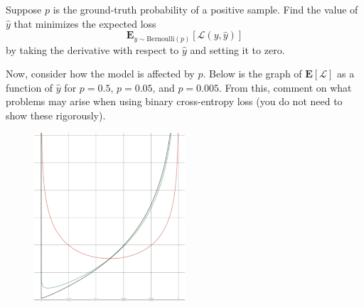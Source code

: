 \documentclass[11pt]{article}
\begin{document}
    \begin{subparts}
        \subpart Suppose $p$ is the ground-truth probability of a positive sample. Find the value of $\hat{y}$ that minimizes the expected loss
        $$\mathbf{E}_{y \sim \text{Bernoulli}(p)}\left[\mathcal{L}(y, \hat{y})\right]$$ by taking the derivative with respect to $\hat{y}$ and setting it to zero.


        \newpage
        \subpart Now, consider how the model is affected by $p$. Below is the graph of $\mathbf{E}[\mathcal{L}]$ as a function of $\hat{y}$ for $p=0.5$, $p=0.05$, and $p=0.005$. From this, comment on what problems may arise when using binary cross-entropy loss (you do not need to show these rigorously).
        \begin{figure}[h] \centering
            \includegraphics[width=0.5\textwidth]{binary-cross-entropy-pqr.png}
        \end{figure}


\end{subparts}
\end{document}
